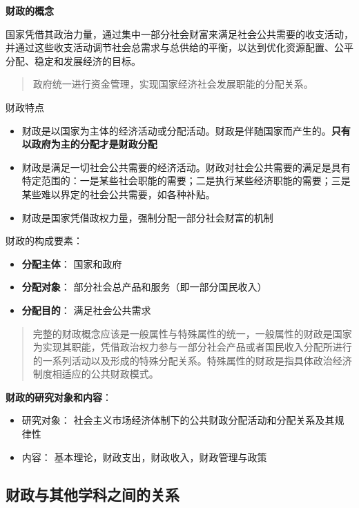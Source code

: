 \documentclass[
]{book}
\providecommand{\tightlist}{%
  \setlength{\itemsep}{0pt}\setlength{\parskip}{0pt}}
\theoremstyle{definition}
\theoremstyle{definition}
\theoremstyle{definition}
\theoremstyle{definition}
\theoremstyle{remark}
\begin{document}
\textbf{财政的概念}

国家凭借其政治力量，通过集中一部分社会财富来满足社会公共需要的收支活动，并通过这些收支活动调节社会总需求与总供给的平衡，以达到优化资源配置、公平分配、稳定和发展经济的目标。

\begin{quote}
政府统一进行资金管理，实现国家经济社会发展职能的分配关系。
\end{quote}

财政特点

\begin{itemize}
\tightlist
\item
  财政是以国家为主体的经济活动或分配活动。财政是伴随国家而产生的。\textbf{只有以政府为主的分配才是财政分配}
\item
  财政是满足一切社会公共需要的经济活动。财政对社会公共需要的满足是具有特定范围的：一是某些社会职能的需要；二是执行某些经济职能的需要；三是某些难以界定的社会公共需要，如各种补贴。
\item
  财政是国家凭借政权力量，强制分配一部分社会财富的机制
\end{itemize}

财政的构成要素：

\begin{itemize}
\tightlist
\item
  \textbf{分配主体}： 国家和政府
\item
  \textbf{分配对象}： 部分社会总产品和服务（即一部分国民收入）
\item
  \textbf{分配目的}： 满足社会公共需求
\end{itemize}

\begin{quote}
完整的财政概念应该是一般属性与特殊属性的统一，一般属性的财政是国家为实现其职能，凭借政治权力参与一部分社会产品或者国民收入分配所进行的一系列活动以及形成的特殊分配关系。特殊属性的财政是指具体政治经济制度相适应的公共财政模式。
\end{quote}

\textbf{财政的研究对象和内容}：

\begin{itemize}
\tightlist
\item
  研究对象： 社会主义市场经济体制下的公共财政分配活动和分配关系及其规律性
\item
  内容： 基本理论，财政支出，财政收入，财政管理与政策
\end{itemize}

\hypertarget{ux8d22ux653fux4e0eux5176ux4ed6ux5b66ux79d1ux4e4bux95f4ux7684ux5173ux7cfb}{%
\subsection{财政与其他学科之间的关系}\label{ux8d22ux653fux4e0eux5176ux4ed6ux5b66ux79d1ux4e4bux95f4ux7684ux5173ux7cfb}}
\end{document}
